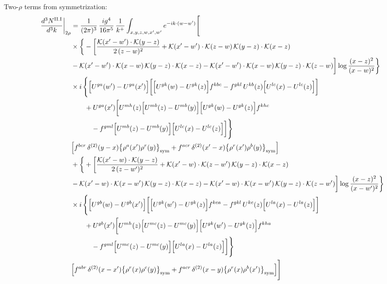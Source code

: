 \documentclass[9pt]{article}
\numberwithin{equation}{section}
\begin{document}
Two-$\rho$ terms from symmetrization: 
\begin{align}
\frac{d^{3}N^{\rm II.I}}{d^{3}k}\bigg|_{2\rho}&=\frac{1}{(2\pi)^{3}}\,\frac{ig^{4}}{16\pi^{5}}\,\frac{1}{k^{+}}\int_{x,y,z,w,x',w'}e^{-ik\cdot(w-w')}\Bigg[\notag\\
&\times\bigg\{-\bigg[\frac{\mathcal{K}(x'-w')\cdot\mathcal{K}(y-z)}{2\,(z-w)^{2}}+\mathcal{K}(x'-w')\cdot\mathcal{K}(z-w)\,\mathcal{K}(y-z)\cdot\mathcal{K}(x-z)\notag\\
&-\mathcal{K}(x'-w')\cdot\mathcal{K}(x-w)\,\mathcal{K}(y-z)\cdot\mathcal{K}(x-z)-\mathcal{K}(x'-w')\cdot\mathcal{K}(x-w)\,\mathcal{K}(y-z)\cdot\mathcal{K}(z-w)\bigg]\log\frac{(x-z)^{2}}{(x-w)^{2}}\bigg\}\notag\\
&\times i\,\Bigg\{\Big[U^{ga}(w')-U^{ga}(x')\Big]\bigg[\Big[U^{gk}(w)-U^{gk}(z)\Big]f^{kbc}-f^{gkl}\,U^{kb}(z)\Big[U^{lc}(x)-U^{lc}(z)\Big]\bigg]\notag\\&\qquad+U^{ga}(x')\bigg[U^{mh}(z)\Big[U^{mb}(z)-U^{mb}(y)\Big]\Big[U^{gk}(w)-U^{gk}(z)\Big]f^{khc}\notag\\&\qquad\quad-f^{gml}\Big[U^{mb}(z)-U^{mb}(y)\Big]\Big[U^{lc}(x)-U^{lc}(z)\Big]\bigg]\Bigg\}\notag \\ & \Big[f^{bcr}\,\delta^{(2)}(y-x)\big\{\rho^{a}(x')\rho^{r}(y)\big\}_{\rm sym} +f^{acr}\,\delta^{(2)}(x'-x)\big\{\rho^{r}(x')\rho^{b}(y)\big\}_{\rm sym}\Big]\notag\\
&+\bigg\{+\bigg[\frac{\mathcal{K}(x'-w)\cdot\mathcal{K}(y-z)}{2\,(z-w')^{2}}+\mathcal{K}(x'-w)\cdot\mathcal{K}(z-w')\,\mathcal{K}(y-z)\cdot\mathcal{K}(x-z)\notag\\
&-\mathcal{K}(x'-w)\cdot\mathcal{K}(x-w')\,\mathcal{K}(y-z)\cdot\mathcal{K}(x-z)-\mathcal{K}(x'-w)\cdot\mathcal{K}(x-w')\,\mathcal{K}(y-z)\cdot\mathcal{K}(z-w')\bigg]\log\frac{(x-z)^{2}}{(x-w')^{2}}\bigg\}\notag\\
&\times i\,\Bigg\{\Big[U^{gb}(w)-U^{gb}(x')\Big]\bigg[\Big[U^{gk}(w')-U^{gk}(z)\Big]f^{kca}-f^{gkl}\,U^{kc}(z)\Big[U^{la}(x)-U^{la}(z)\Big]\bigg]\notag\\&\qquad+U^{gb}(x')\bigg[U^{mh}(z)\Big[U^{mc}(z)-U^{mc}(y)\Big]\Big[U^{gk}(w')-U^{gk}(z)\Big]f^{kha}\notag\\&\qquad\quad-f^{gml}\Big[U^{mc}(z)-U^{mc}(y)\Big]\Big[U^{la}(x)-U^{la}(z)\Big]\bigg]\Bigg\}\notag \\ & \Big[f^{abr}\,\delta^{(2)}(x-x')\big\{\rho^{r}(x)\rho^{c}(y)\big\}_{\rm sym} +f^{acr}\,\delta^{(2)}(x-y)\big\{\rho^{r}(x)\rho^{b}(x')\big\}_{\rm sym}\Big]\Bigg]\label{eq:H-II.I-2}
\end{align}
\end{document}
